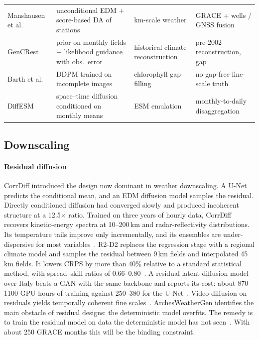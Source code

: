 \begin{table}[!t]
\begin{tabularx}{\textwidth}{@{}l L L L@{}}
Manshausen et al.~\cite{manshausen2025genda} & unconditional EDM + score-based DA of stations & km-scale weather & GRACE + wells / GNSS fusion \\
GenCRest~\cite{qian2026gencrest} & prior on monthly fields + likelihood guidance with obs.\ error & historical climate reconstruction & pre-2002 reconstruction, gap \\
Barth et al.~\cite{barth2024dindiff} & DDPM trained on incomplete images & chlorophyll gap filling & no gap-free fine-scale truth \\
DiffESM~\cite{bassetti2024diffesm} & space--time diffusion conditioned on monthly means & ESM emulation & monthly-to-daily disaggregation \\
\bottomrule
\end{tabularx}
\end{table}

\subsection{Downscaling}

\paragraph{Residual diffusion} CorrDiff introduced the design now dominant in weather downscaling. A U-Net predicts the conditional mean, and an EDM diffusion model samples the residual. Directly conditioned diffusion had converged slowly and produced incoherent structure at a 12.5$\times$ ratio. Trained on three years of hourly data, CorrDiff recovers kinetic-energy spectra at 10--200\,km and radar-reflectivity distributions. Its temperature tails improve only incrementally, and its ensembles are under-dispersive for most variables~\cite{mardani2025corrdiff}. R2-D2 replaces the regression stage with a regional climate model and samples the residual between 9\,km fields and interpolated 45\,km fields. It lowers CRPS by more than 40\% relative to a standard statistical method, with spread--skill ratios of 0.66--0.80~\cite{lopezgomez2025r2d2}. A residual latent diffusion model over Italy beats a GAN with the same backbone and reports its cost: about 870--1100 GPU-hours of training against 250--380 for the U-Net~\cite{tomasi2025ldm}. Video diffusion on residuals yields temporally coherent fine scales~\cite{srivastava2024stvd}. ArchesWeatherGen identifies the main obstacle of residual designs: the deterministic model overfits. The remedy is to train the residual model on data the deterministic model has not seen~\cite{couairon2024arches}. With about 250 GRACE months this will be the binding constraint.

